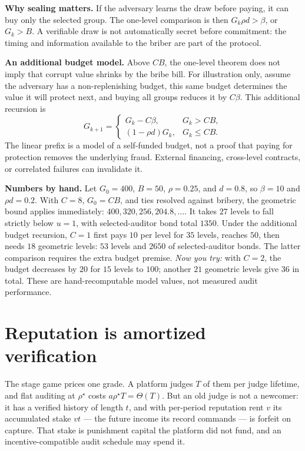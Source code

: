 \documentclass[11pt,a4paper]{article}
\begin{document}
\textbf{Why sealing matters.} If the adversary learns the draw before paying, it can buy only the selected group. The one-level comparison is then $G_k\rho d>\beta$, or $G_k>B$. A verifiable draw is not automatically secret before commitment: the timing and information available to the briber are part of the protocol.

\textbf{An additional budget model.} Above $CB$, the one-level theorem does not imply that corrupt value shrinks by the bribe bill. For illustration only, assume the adversary has a non-replenishing budget, this same budget determines the value it will protect next, and buying all groups reduces it by $C\beta$. This additional recursion is
\[
G_{k+1}=\begin{cases}G_k-C\beta,&G_k>CB,\\
(1-\rho d)G_k,&G_k\le CB.\end{cases}
\]
The linear prefix is a model of a self-funded budget, not a proof that paying for protection removes the underlying fraud. External financing, cross-level contracts, or correlated failures can invalidate it.

\textbf{Numbers by hand.} Let $G_0=400$, $B=50$, $\rho=0.25$, and $d=0.8$, so $\beta=10$ and $\rho d=0.2$. With $C=8$, $G_0=CB$, and ties resolved against bribery, the geometric bound applies immediately: $400,320,256,204.8,\ldots$. It takes $27$ levels to fall strictly below $u=1$, with selected-auditor bond total $1350$. Under the additional budget recursion, $C=1$ first pays $10$ per level for $35$ levels, reaches $50$, then needs $18$ geometric levels: $53$ levels and $2650$ of selected-auditor bonds. The latter comparison requires the extra budget premise. \emph{Now you try:} with $C=2$, the budget decreases by $20$ for $15$ levels to $100$; another $21$ geometric levels give $36$ in total. These are hand-recomputable model values, not measured audit performance.

\section{Reputation is amortized verification}\label{sec:amort}
The stage game prices one grade. A platform judges $T$ of them per judge lifetime, and flat auditing at $\rho^\star$ costs $a\rho^\star T = \Theta(T)$. But an old judge is not a newcomer: it has a verified history of length $t$, and with per-period reputation rent $v$ its accumulated stake $vt$ --- the future income its record commands --- is forfeit on capture. That stake is punishment capital the platform did not fund, and an incentive-compatible audit schedule may spend it.
\end{document}
